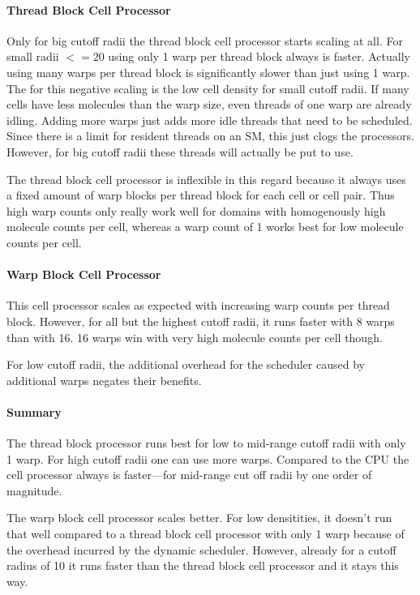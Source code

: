\paragraph{Thread Block Cell Processor}
Only for big cutoff radii the thread block cell processor starts scaling at all. For small radii $<= 20$ using only 1 warp per thread block always is faster. Actually using many warps per thread block is significantly slower than just using 1 warp. The for this negative scaling is the low cell density  for small cutoff radii. If many cells have less molecules than the warp size, even threads of one warp are already idling. Adding more warps just adds more idle threads that need to be scheduled. Since there is a limit for resident threads on an SM, this just clogs the processors.
However, for big cutoff radii these threads will actually be put to use.

The thread block cell processor is inflexible in this regard because it always uses a fixed amount of warp blocks per thread block for each cell or cell pair. Thus high warp counts only really work well for domains with homogenously high molecule counts per cell, whereas a warp count of 1 works best for low molecule counts per cell.

\paragraph{Warp Block Cell Processor}
This cell processor scales as expected with increasing warp counts per thread block. However, for all but the highest cutoff radii, it runs faster with 8 warps than with 16. 16 warps win with very high molecule counts per cell though.

For low cutoff radii, the additional overhead for the scheduler caused by additional warps negates their benefits.

\paragraph{Summary}
The thread block processor runs best for low to mid-range cutoff radii with only 1 warp. For high cutoff radii one can use more warps.
Compared to the CPU the cell processor always is faster---for mid-range cut off radii by one order of magnitude.

The warp block cell processor scales better. For low densitities, it doesn't run that well compared to a thread block cell processor with only 1 warp because of the overhead incurred by the dynamic scheduler.
However, already for a cutoff radius of 10 it runs faster than the thread block cell processor and it stays this way.

